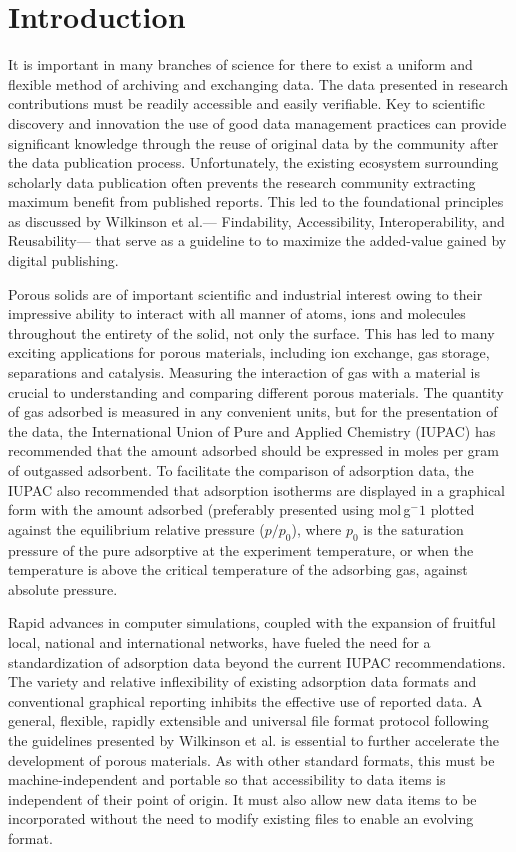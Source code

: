 \documentclass[journal=langd5,manuscript=article]{achemso}
\begin{document}
\section{Introduction}
It is important in many branches of science for there to exist a uniform and flexible method of archiving and exchanging data.
The data presented in research contributions must be readily accessible and easily verifiable.
Key to scientific discovery and innovation the use of good data management practices can  provide significant knowledge through the reuse of original data by the community after the data publication process.\cite{10.1002/adts.201900131}
Unfortunately, the existing ecosystem surrounding scholarly data publication often prevents the research community extracting maximum benefit from published reports.
This led to the foundational principles as discussed by Wilkinson et al.--- Findability, Accessibility, Interoperability, and Reusability--- that serve as a guideline to to maximize the added-value gained by digital publishing.\cite{10.1038/sdata.2016.18}

Porous solids are of important scientific and industrial interest owing to their impressive ability to interact with all manner of atoms, ions and molecules throughout the entirety of the solid, not only the surface.\cite{10.1038/nature00785}
This has led to many exciting applications for porous materials, including ion exchange, gas storage, separations and catalysis.\cite{10.1039/C6CS00135A}
Measuring the interaction of gas with a material is crucial to understanding and comparing different porous materials.
The quantity of gas adsorbed is measured in any convenient units, but for the presentation of the data, the International Union of Pure and Applied Chemistry (IUPAC) has recommended that the amount adsorbed should be expressed in moles per gram of outgassed adsorbent.\cite{10.1515/pac-2014-1117}
To facilitate the comparison of adsorption data, the IUPAC also recommended that adsorption isotherms are displayed in a graphical form with the amount adsorbed (preferably presented using mol$\,$g$^-1$ plotted against the equilibrium relative pressure ($p/p_0$), where $p_0$ is the saturation pressure of the pure adsorptive at the experiment temperature, or when the temperature is above the critical temperature of the adsorbing gas, against absolute pressure.

Rapid advances in computer simulations, coupled with the expansion of fruitful local, national and international networks, have fueled the need for a standardization of adsorption data beyond the current IUPAC recommendations.
The variety and relative inflexibility of existing adsorption data formats and conventional graphical reporting inhibits the effective use of reported data.
A general, flexible, rapidly extensible and universal file format protocol following the guidelines presented by Wilkinson et al. is essential to further accelerate the development of porous materials.
As with other standard formats, this must be machine-independent and portable so that accessibility to data items is independent of their point of origin.
It must also allow new data items to be incorporated without the need to modify existing files to enable an evolving format.
\end{document}
